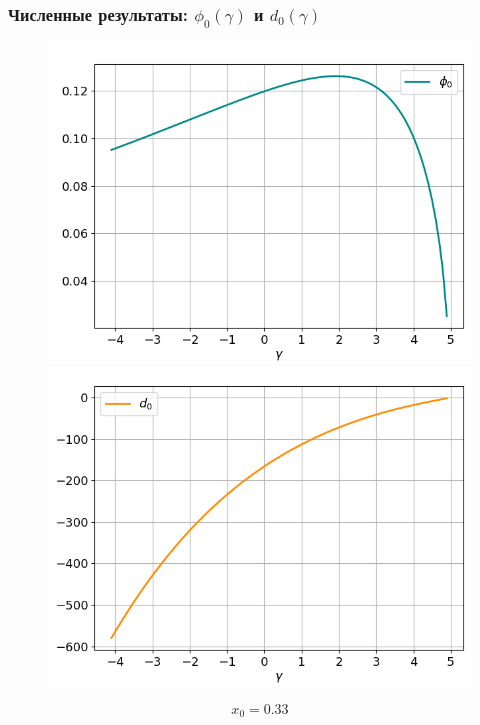 \documentclass[fullscreen=true, unicode, bookmarks=false]{beamer}
\begin{document}
\begin{frame}
\frametitle{ Численные результаты: $ \phi_0(\gamma) $ и $ d_0(\gamma) $ }

\begin{figure} 
\includegraphics[scale=0.37]{oscillating_phi0_13.png}  
\hfill
\includegraphics[scale=0.37]{oscillating_d0_13.png}  
\end{figure}

$$ x_0 = 0.33 $$

\end{frame}
\end{document}
